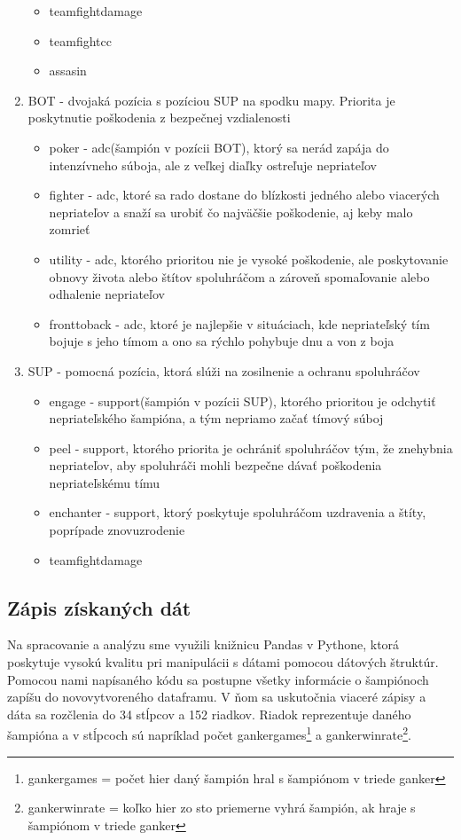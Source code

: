 \begin{enumerate}
\begin{itemize}
		\item teamfightdamage 
		\item teamfightcc 
		\item assasin
	\end{itemize}
	\item BOT - dvojaká pozícia s pozíciou SUP na spodku mapy. Priorita je poskytnutie poškodenia z bezpečnej vzdialenosti
	\begin{itemize}
		\item poker - adc(šampión v pozícii BOT), ktorý sa nerád zapája do intenzívneho súboja, ale z veľkej diaľky ostreľuje nepriateľov
		\item fighter - adc, ktoré sa rado dostane do blízkosti jedného alebo viacerých nepriateľov a snaží sa urobiť čo najväčšie poškodenie, aj keby malo zomrieť 
		\item utility - adc, ktorého prioritou nie je vysoké poškodenie, ale poskytovanie obnovy života alebo štítov spoluhráčom a zároveň spomaľovanie alebo odhalenie nepriateľov
		\item fronttoback - adc, ktoré je najlepšie v situáciach, kde nepriateľský tím bojuje s jeho tímom a ono sa rýchlo pohybuje dnu a von z boja
	\end{itemize}
\item SUP - pomocná pozícia, ktorá slúži na zosilnenie a ochranu spoluhráčov
\begin{itemize}
	\item engage - support(šampión v pozícii SUP), ktorého prioritou je odchytiť nepriateľského šampióna, a tým nepriamo začať tímový súboj
	\item peel - support, ktorého priorita je ochrániť spoluhráčov tým, že znehybnia nepriateľov, aby spoluhráči mohli bezpečne dávať poškodenia nepriateľskému tímu
	\item enchanter - support, ktorý poskytuje spoluhráčom uzdravenia a štíty, poprípade znovuzrodenie
	\item teamfightdamage
\end{itemize}
\end{enumerate}
\subsection{Zápis získaných dát}
Na spracovanie a analýzu sme využili knižnicu Pandas v Pythone, ktorá poskytuje vysokú kvalitu pri manipulácii s dátami pomocou dátových štruktúr. Pomocou nami napísaného kódu sa postupne všetky informácie o šampiónoch zapíšu do novovytvoreného dataframu. V ňom sa uskutočnia viaceré zápisy a dáta sa rozčlenia do 34 stĺpcov a 152 riadkov. Riadok reprezentuje daného šampióna a v stĺpcoch sú napríklad počet gankergames\footnote {gankergames = počet hier daný šampión hral s šampiónom v triede ganker} a gankerwinrate\footnote {gankerwinrate = koľko hier zo sto priemerne vyhrá šampión, ak hraje s šampiónom v triede ganker}.
